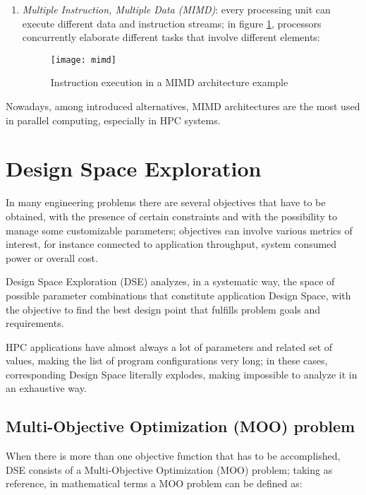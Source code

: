 \begin{enumerate}
    \item \textit{Multiple Instruction, Multiple Data (MIMD)}: every processing unit can execute different data and instruction streams; in figure \ref{fig::mimd}, processors concurrently elaborate different tasks that involve different elements:
    
    \begin{figure}[H]

        \centering
        \texttt{[image: mimd]}
        \caption{Instruction execution in a MIMD architecture example}
        \label{fig::mimd}
    
    \end{figure}

\end{enumerate}

Nowadays, among introduced alternatives, MIMD architectures are the most used in parallel computing, especially in HPC systems.





\section{Design Space Exploration}

In many engineering problems there are several objectives that have to be obtained, with the presence of certain constraints and with the possibility to manage some customizable parameters; objectives can involve various metrics of interest, for instance connected to application throughput, system consumed power or overall cost.

Design Space Exploration (DSE) analyzes, in a systematic way, the space of possible parameter combinations that constitute application Design Space, with the objective to find the best design point that fulfills problem goals and requirements.

HPC applications have almost always a lot of parameters and related set of values, making the list of program configurations very long; in these cases, corresponding Design Space literally explodes, making impossible to analyze it in an exhaustive way.

\subsection{Multi-Objective Optimization (MOO) problem}

When there is more than one objective function that has to be accomplished, DSE consists of a Multi-Objective Optimization (MOO) problem; taking \cite{caramia2008multi} as reference, in mathematical terms a MOO problem can be defined as:


